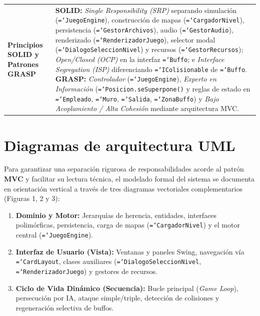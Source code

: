 \documentclass[12pt, a4paper]{article}
\DeclareRobustCommand{\code}[1]{\textcolor{codegreen}{\texttt{\hyphenchar\font=`\-#1}}}
\begin{document}
{\begin{longtable}{@{} >{\raggedright\arraybackslash}p{3.8cm} >{\raggedright\arraybackslash}p{11.4cm} @{}}
\addlinespace[5pt]
\textbf{Principios SOLID y Patrones GRASP} & \textbf{SOLID:} \textit{Single Responsibility (SRP)} separando simulación (\code{JuegoEngine}), construcción de mapas (\code{CargadorNivel}), persistencia (\code{GestorArchivos}), audio (\code{GestorAudio}), renderizado (\code{RenderizadorJuego}), selector modal (\code{DialogoSeleccionNivel}) y recursos (\code{GestorRecursos}); \textit{Open/Closed (OCP)} en la interfaz \code{Buffo}; e \textit{Interface Segregation (ISP)} diferenciando \code{IColisionable} de \code{Buffo}. \textbf{GRASP:} \textit{Controlador} (\code{JuegoEngine}), \textit{Experto en Información} (\code{Posicion.seSuperpone()} y reglas de estado en \code{Empleado}, \code{Muro}, \code{Salida}, \code{ZonaBuffo}) y \textit{Bajo Acoplamiento / Alta Cohesión} mediante arquitectura MVC. \\
\end{longtable}
}

\section{Diagramas de arquitectura UML}

Para garantizar una separación rigurosa de responsabilidades acorde al patrón \textbf{MVC} y facilitar su lectura técnica, el modelado formal del sistema se documenta en orientación vertical a través de tres diagramas vectoriales complementarios (Figuras 1, 2 y 3):

\begin{enumerate}[leftmargin=1.27cm]
    \item \textbf{Dominio y Motor:} Jerarquías de herencia, entidades, interfaces polimórficas, persistencia, carga de mapas (\code{CargadorNivel}) y el motor central (\code{JuegoEngine}).
    \item \textbf{Interfaz de Usuario (Vista):} Ventanas y paneles Swing, navegación vía \code{CardLayout}, clases auxiliares (\code{DialogoSeleccionNivel}, \code{RenderizadorJuego}) y gestores de recursos.
    \item \textbf{Ciclo de Vida Dinámico (Secuencia):} Bucle principal (\textit{Game Loop}), persecución por IA, ataque simple/triple, detección de colisiones y regeneración selectiva de buffos.
\end{enumerate}
\end{document}
